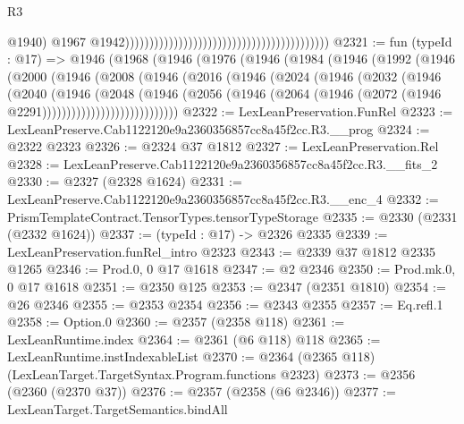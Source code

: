 \begin{lexlean}{R3}
\begin{coremodule}
                                                                                          @1940)
                                                                                        @1967
                                                                                        @1942))))))))))))))))))))))))))))))))))))))))))
@2321 := fun (typeId : @17) =>
  @1946
    (@1968
      (@1946
        (@1976
          (@1946
            (@1984
              (@1946
                (@1992
                  (@1946
                    (@2000
                      (@1946
                        (@2008
                          (@1946
                            (@2016
                              (@1946
                                (@2024
                                  (@1946
                                    (@2032
                                      (@1946
                                        (@2040
                                          (@1946
                                            (@2048
                                              (@1946
                                                (@2056
                                                  (@1946
                                                    (@2064
                                                      (@1946
                                                        (@2072
                                                          (@1946 @2291))))))))))))))))))))))))))))
@2322 := LexLeanPreservation.FunRel
@2323 := LexLeanPreserve.Cab1122120e9a2360356857cc8a45f2cc.R3.__prog
@2324 := @2322 @2323
@2326 := @2324 @37 @1812
@2327 := LexLeanPreservation.Rel
@2328 := LexLeanPreserve.Cab1122120e9a2360356857cc8a45f2cc.R3.__fits_2
@2330 := @2327 (@2328 @1624)
@2331 := LexLeanPreserve.Cab1122120e9a2360356857cc8a45f2cc.R3.__enc_4
@2332 := PrismTemplateContract.TensorTypes.tensorTypeStorage
@2335 := @2330 (@2331 (@2332 @1624))
@2337 := (typeId : @17) -> @2326 @2335
@2339 := LexLeanPreservation.funRel_intro @2323
@2343 := @2339 @37 @1812 @2335 @1265
@2346 := Prod.{0, 0} @17 @1618
@2347 := @2 @2346
@2350 := Prod.mk.{0, 0} @17 @1618
@2351 := @2350 @125
@2353 := @2347 (@2351 @1810)
@2354 := @26 @2346
@2355 := @2353 @2354
@2356 := @2343 @2355
@2357 := Eq.refl.{1}
@2358 := Option.{0}
@2360 := @2357 (@2358 @118)
@2361 := LexLeanRuntime.index
@2364 := @2361 (@6 @118) @118
@2365 := LexLeanRuntime.instIndexableList
@2370 := @2364 (@2365 @118) (LexLeanTarget.TargetSyntax.Program.functions @2323)
@2373 := @2356 (@2360 (@2370 @37))
@2376 := @2357 (@2358 (@6 @2346))
@2377 := LexLeanTarget.TargetSemantics.bindAll

\end{coremodule}
\end{lexlean}
